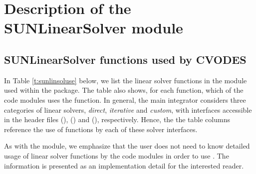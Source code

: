 \chapter{Description of the SUNLinearSolver module}\label{s:sunlinsol}



\section{SUNLinearSolver functions used by CVODES}

In Table \ref{t:sunlinsoluse} below, we list the linear solver
functions in the {\sunlinsol} module used within the {\cvodes} package.
The table also shows, for each function, which of the code modules uses
the function.  In general, the main {\cvodes} integrator considers
three categories of linear solvers, \emph{direct}, \emph{iterative}
and \emph{custom}, with interfaces accessible in the {\cvodes} header
files  ({\cvdls}), 
({\cvspils}) and  ({\cvcls}), respectively.
Hence, the the table columns reference the use of {\sunlinsol}
functions by each of these solver interfaces.

As with the {\sunmatrix} module, we emphasize that the {\cvodes} user
does not need to know detailed usage of linear solver functions by the
{\cvodes} code modules in order to use {\cvodes}. The information is
presented as an implementation detail for the interested reader.

